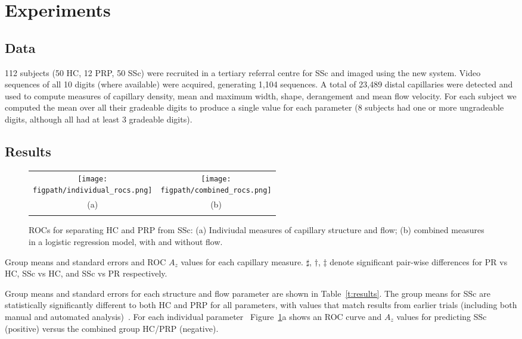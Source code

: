 \documentclass[runningheads,a4paper]{llncs}
\def\figpath{./figs}
\newcommand{\fref}[1]{Figure~\ref{#1}}
\newcommand{\tref}[1]{Table~\ref{#1}}
\def\figpath{./figs}
\begin{document}
\section{Experiments}
\label{s:experiments}
%
\subsection{Data}
\label{s:data}
112 subjects (50 HC, 12 PRP, 50 SSc) were recruited in a tertiary referral centre for SSc and imaged using the new system. Video sequences of all 10 digits (where available) were acquired, generating 1,104 sequences.  A total of 23,489 distal capillaries were detected and used to compute measures of capillary density, mean and maximum width, shape, derangement and mean flow velocity. For each subject we computed the mean over all their gradeable digits to produce a single value for each parameter (8 subjects had one or more ungradeable digits, although all had at least 3 gradeable digits).
%
\subsection{Results}
\label{s:results}
%
\begin{figure}[t]
\centering
\begin{tabular}{@{}c c@{}}
\texttt{[image: \\figpath/individual\_rocs.png]} &
\texttt{[image: \\figpath/combined\_rocs.png]} \\
(a) & (b)\\
\noalign{\smallskip}
\end{tabular}
%
\caption{ROCs for separating HC and PRP from SSc: %
(a) Indiviudal measures of capillary structure and flow; %
(b) combined measures in a logistic regression model, with and without flow.
}
\label{f:subject_rocs}
\end{figure}
%
\begin{table}[tb]
\centering

%
\caption{Group means and standard errors and ROC $A_z$ values for each capillary measure. $\sharp$, $\dagger$, $\ddagger$ denote significant pair-wise differences for PR vs HC, SSc vs HC, and SSc vs PR respectively.}
\label{t:results}
\end{table}
%
Group means and standard errors for each structure and flow parameter are shown in \tref{t:results}. The group means for SSc are statistically significantly different to both HC and PRP for all parameters, with values that match results from earlier trials (including both manual and automated analysis)~\cite{Murray_etal_AR09,Berks_MICCAI14}. For each individual parameter ~\fref{f:subject_rocs}a shows an ROC curve and $A_z$ values for predicting SSc (positive) versus the combined group HC/PRP (negative).
\end{document}
